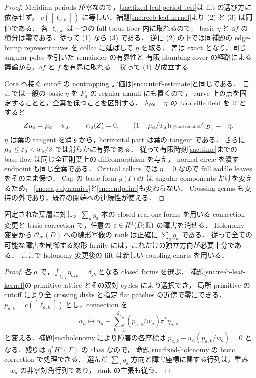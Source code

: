 \begin{proof}
Meridian periods が零なので，\eqref{snc:fixed-leaf-period-test}は lift の選び方に依存せず，
$c([\ell_{a,k}])$ に等しい．補題\ref{snc:reeb-leaf-kernel}より (2) と (3) は同値である．
各 $\widetilde\ell_{a,k}$ は一つの full torus fiber 内に取れるので，
basic $\eta$ と $\dd f$ の積分は零である．従って (1) なら (3) である．
逆に (2) の下では同補題の edge-bump representatives を collar に延ばして $\eta$ を取る．
差は exact となり，同じ angular poles を引いた remainder の有界性と
有限 plumbing cover の経路による議論から，$\dd f$ と $f$ を有界に取れる．
従って (1) が成立する．

Core へ接ぐ cutoff の nontrapping 評価は\eqref{snc:cutoff-estimate}と同じである．
ここでは一般の basic $\eta$ を $P_a$ の regular annuli にも置くので，
curve 上の点を固定することと，全葉を保つことを区別する．
$\lambda_{\rm col}-\eta$ の Liouville field を $Z$ とすると
\[
 Z\mu_a=\mu_a-w_a,\qquad \alpha_a(Z)=0,\qquad
 (1-\mu_a/w_a)\iota_{Z^{\rm horizontal}}\omega'|_{D_a}=-\eta.
\]
$\eta$ は葉の tangent を消すから，horizontal part は葉の tangent である．
さらに $\mu_a\le\varepsilon_a<w_a/2$ では滑らかに有界である．
従って有限時刻\eqref{snc:time}までの base flow は同じ全正則葉上の diffeomorphism を与え，
normal circle を潰す endpoint も同じ全葉である．
Critical collars では $\eta=0$ なので full saddle leaves をそのまま保つ．
Cap の basic form $g(I)\dd I$ は angular components だけを変えるため，
\eqref{snc:cap-dynamics}と\eqref{snc:endpoint}も変わらない．
Crossing germs も支持の外であり，既存の閉端への連続性が使える．
\end{proof}

\begin{corollary}
\label{snc:minimal-holonomy-controls}
固定された葉層に対し，$\sum_a g_a$ 本の closed real one-forms を用いる connection
変更と basic correction で，任意の $c\in H^1(D;\mathbb R)$ の障害を消せる．
Holonomy 変更から $\mathcal O_{\mathcal F}(D)$ への線形写像の rank は正確に $\sum_a g_a$ である．
従って全ての可能な障害を制御する線形 family には，これだけの独立方向が必要十分である．
ここで holonomy 変更後の lift は新しい coupling charts を用いる．
\end{corollary}

\begin{proof}
各 $a$ で，$\int_{\ell_{a,j}}\eta_{a,k}=\delta_{jk}$ となる closed forms を選ぶ．
補題\ref{snc:reeb-leaf-kernel}の primitive lattice とその双対 cycles により選択でき，
局所 primitive の cutoff により全 crossing disks と指定 flat patches の近傍で零にできる．
$p_{a,k}=c([\ell_{a,k}])$ とし，connection を
\[
 \alpha_a\longmapsto\alpha_a+
       \sum_{k=1}^{g_a}(p_{a,k}/w_a)\pi^*\eta_{a,k}
\]
と変える．補題\ref{snc:holonomy}により障害の各座標は
$p_{a,k}-w_a(p_{a,k}/w_a)=0$ となる．残りは $q^*H^1(\Gamma)$ の class なので，
命題\ref{snc:fixed-holonomy}の basic correction で処理できる．
選んだ $\sum_a g_a$ 方向と障害座標に関する行列は，重み $-w_a$ の非零対角行列であり，
rank の主張も従う．
\end{proof}

